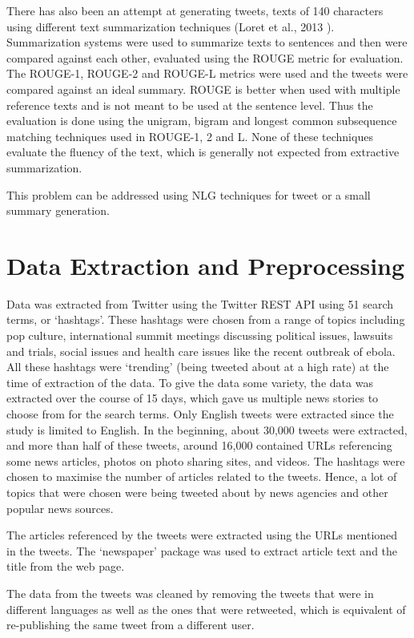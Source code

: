 \documentclass[11pt]{article}
\begin{document}
There has also been an attempt at generating tweets, texts of 140 characters using different text summarization techniques (Loret et al., 2013 \cite{lloret2013towards}). Summarization systems were used to summarize texts to sentences and then were compared against each other, evaluated using the ROUGE metric for evaluation. The ROUGE-1, ROUGE-2 and ROUGE-L metrics were used and the tweets were compared against an ideal summary. ROUGE is better when used with multiple reference texts and is not meant to be used at the sentence level. Thus the evaluation is done using the unigram, bigram and longest common subsequence matching techniques used in ROUGE-1, 2 and L. None of these techniques evaluate the fluency of the text, which is generally not expected from extractive summarization. 

This problem can be addressed using NLG techniques for tweet or a small summary generation.


\section{Data Extraction and Preprocessing}

Data was extracted from Twitter using the Twitter REST API using 51 search terms, or ‘hashtags’. These hashtags were chosen from a range of topics including pop culture,  international summit meetings discussing political issues, lawsuits and trials, social issues and health care issues like the recent outbreak of ebola. All these hashtags were ‘trending’ (being tweeted about at a high rate) at the time of extraction of the data. To give the data some variety, the data was extracted over the course of 15 days, which gave us multiple news stories to choose from for the search terms. Only English tweets were extracted since the study is limited to English. In the beginning, about 30,000 tweets were extracted, and more than half of these tweets, around 16,000 contained URLs referencing some news articles, photos on photo sharing sites, and videos. The hashtags were chosen to maximise the number of articles related to the tweets. Hence, a lot of topics that were chosen were being tweeted about by news agencies and other popular news sources.

The articles referenced by the tweets were extracted using the URLs mentioned in the tweets. The ‘newspaper’ package was used to extract article text and the title from the web page.


The data from the tweets was cleaned by removing the tweets that were in different languages as well as the ones that were retweeted, which is equivalent of re-publishing the same tweet from a different user. 
\end{document}
